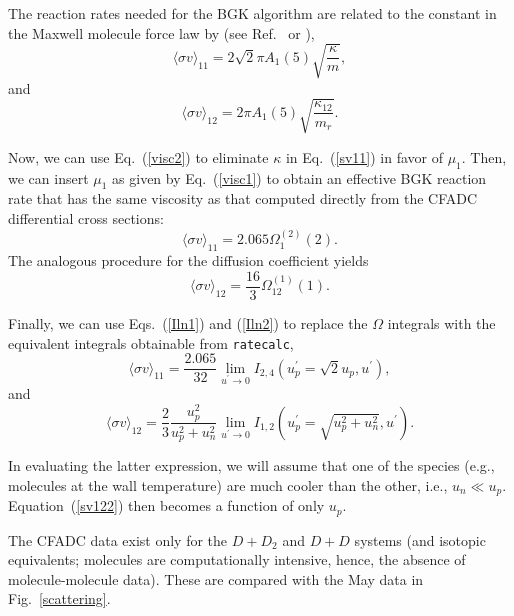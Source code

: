 \documentclass[12pt]{report}
\begin{document}
The reaction rates needed for the BGK algorithm are related to the constant
in the Maxwell molecule force law by (see Ref.~\cite{Mors63} or \cite{Mayxx}),
\begin{equation}
\langle \sigma v \rangle_{11} = 2 \sqrt{2} \pi A_{1}(5)
\sqrt{\frac{\kappa}{m}},
\label{sv11}
\end{equation}
and 
\begin{equation}
\langle \sigma v \rangle_{12} = 2 \pi A_{1}(5)
\sqrt{\frac{\kappa_{12}}{m_{r}}}.
\label{sv12}
\end{equation}

Now, we can use Eq.~(\ref{visc2}) to eliminate $\kappa$ in Eq.~(\ref{sv11})
in favor of $\mu_{1}$. Then, we can insert  $\mu_{1}$ as given by
Eq.~(\ref{visc1}) to obtain an effective BGK reaction rate that has the
same viscosity as that computed directly from the CFADC differential
cross sections:
\begin{equation}
\langle \sigma v \rangle_{11} = 2.065 \Omega_{1}^{(2)}(2).
\end{equation}
The analogous procedure for the diffusion coefficient yields
\begin{equation}
\langle \sigma v \rangle_{12} = \frac{16}{3} \Omega_{12}^{(1)}(1).
\end{equation}

Finally, we can use Eqs.~(\ref{Iln1}) and (\ref{Iln2}) to
replace the $\Omega$ integrals with the equivalent integrals obtainable
from {\tt ratecalc},
\begin{equation}
\langle \sigma v \rangle_{11} = \frac{2.065}{32} 
\lim_{u^{\prime} \rightarrow 0} I_{2,4} (u_{p}^{\prime} = \sqrt{2} u_{p},
u^{\prime}),
\end{equation}
and
\begin{equation}
\langle \sigma v \rangle_{12} = \frac{2}{3} 
\frac{u_{p}^{2}}{u_{p}^{2} + u_{n}^{2}} 
\lim_{u^{\prime} \rightarrow 0} I_{1,2} 
(u_{p}^{\prime} = \sqrt{u_{p}^{2} + u_{n}^{2}}, u^{\prime}).
\label{sv122}
\end{equation}

In evaluating the latter expression, we will assume that one of the
species (e.g., molecules at the wall temperature) are much cooler
than the other, i.e., $u_{n} \ll u_{p}$. Equation~(\ref{sv122}) then
becomes a function of only $u_{p}$.

The CFADC data exist only for the $D + D_{2}$ and $D + D$ systems 
(and isotopic equivalents; molecules are computationally intensive, hence,
the absence of molecule-molecule data). These are compared with the 
May data in Fig.~\ref{scattering}. 
\end{document}
